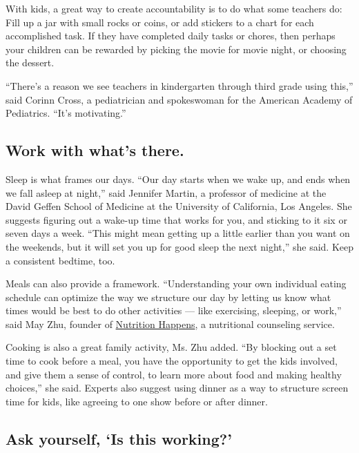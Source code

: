 With kids, a great way to create accountability is to do what some
teachers do: Fill up a jar with small rocks or coins, or add stickers to
a chart for each accomplished task. If they have completed daily tasks
or chores, then perhaps your children can be rewarded by picking the
movie for movie night, or choosing the dessert.

``There's a reason we see teachers in kindergarten through third grade
using this,'' said Corinn Cross, a pediatrician and spokeswoman for the
American Academy of Pediatrics. ``It's motivating.''

\hypertarget{work-with-whats-there}{%
\subsection{Work with what's there.}\label{work-with-whats-there}}

Sleep is what frames our days. ``Our day starts when we wake up, and
ends when we fall asleep at night,'' said Jennifer Martin, a professor
of medicine at the David Geffen School of Medicine at the University of
California, Los Angeles. She suggests figuring out a wake-up time that
works for you, and sticking to it six or seven days a week. ``This might
mean getting up a little earlier than you want on the weekends, but it
will set you up for good sleep the next night,'' she said. Keep a
consistent bedtime, too.

Meals can also provide a framework. ``Understanding your own individual
eating schedule can optimize the way we structure our day by letting us
know what times would be best to do other activities --- like
exercising, sleeping, or work,'' said May Zhu, founder of
\href{http://www.nutritionhappens.com/}{Nutrition Happens}, a
nutritional counseling service.

Cooking is also a great family activity, Ms. Zhu added. ``By blocking
out a set time to cook before a meal, you have the opportunity to get
the kids involved, and give them a sense of control, to learn more about
food and making healthy choices,'' she said. Experts also suggest using
dinner as a way to structure screen time for kids, like agreeing to one
show before or after dinner.

\hypertarget{ask-yourself-is-this-working}{%
\subsection{Ask yourself, `Is this
working?'}\label{ask-yourself-is-this-working}}

